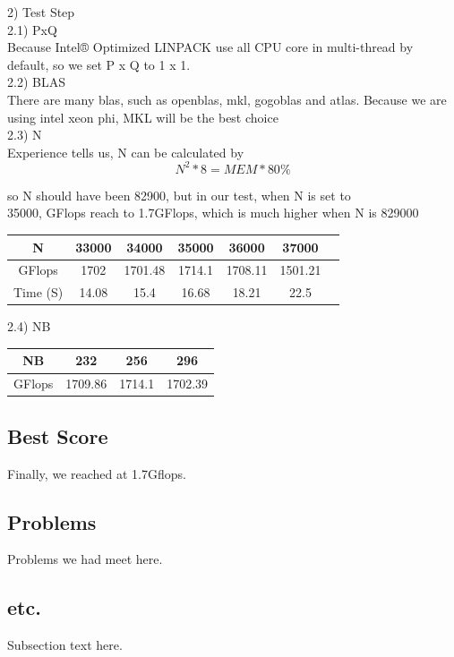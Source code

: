 \documentclass[conference,compsoc]{report}
\begin{document}
2) Test Step \\

2.1) PxQ \\

Because Intel® Optimized LINPACK use all CPU core in multi-thread
by default, so we set P x Q to 1 x 1. \\

2.2) BLAS \\
There are many blas, such as openblas, mkl, gogoblas and atlas.
Because we are using intel xeon phi, MKL will be the best choice \\

2.3) N \\
Experience tells us, N can be calculated by 
\[ N^2 * 8 = MEM * 80\% \]

so N should have been  82900, but in our test, when N is set to \\
35000, GFlops reach to 1.7GFlops, which is much higher when N is 829000 \\

\begin{tabular}{|c|c|c|c|c|c|c|}
\hline
N &  33000 & 34000 & 35000 & 36000 & 37000  \\
\hline
GFlops  &1702 &1701.48 &1714.1 &1708.11 &1501.21 \\
\hline
Time (S) &14.08 &15.4 &16.68 &18.21 &22.5 \\
\hline 
\end{tabular}
\newline
\newline
\par
2.4) NB \\
\par
\begin{tabular}{|c|c|c|c|}
\hline
NB & 232 & 256 & 296 \\
\hline
GFlops & 1709.86 & 1714.1 & 1702.39 \\
\hline
\end{tabular}

\subsection{Best Score}
Finally, we reached at 1.7Gflops. 
\subsection{Problems}
Problems we had meet here.

\subsection{etc.}
Subsection text here.
\end{document}
